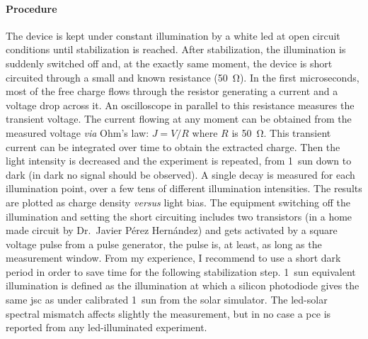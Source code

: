 	\paragraph{Procedure}
	The device is kept under constant illumination by a white \gls{led} at open circuit conditions until stabilization is reached.
	After stabilization, the illumination is suddenly switched off and, at the exactly same moment, the device is short circuited through a small and known resistance (\SI{50}{\ohm}).
	In the first microseconds, most of the free charge flows through the resistor generating a current and a voltage drop across it.
	An oscilloscope in parallel to this resistance measures the transient voltage.
	The current flowing at any moment can be obtained from the measured voltage \textsl{via} Ohm's law: $J=V/R$ where $R$ is \SI{50}{\ohm}.
	This transient current can be integrated over time to obtain the extracted charge.
	Then the light intensity is decreased and the experiment is repeated, from 1~sun down to dark (in dark no signal should be observed).
	A single decay is measured for each illumination point, over a few tens of different illumination intensities.
	The results are plotted as charge density \textsl{versus} light bias.
	The equipment switching off the illumination and setting the short circuiting includes two transistors (in a home made circuit by Dr.\ Javier Pérez Hernández) and gets activated by a square voltage pulse from a pulse generator, the pulse is, at least, as long as the measurement window.
	From my experience, I recommend to use a short dark period in order to save time for the following stabilization step.
	1~sun equivalent illumination is defined as the illumination at which a silicon photodiode gives the same \gls{jsc} as under calibrated 1~sun from the solar simulator.
	The \gls{led}-solar spectral mismatch affects slightly the measurement, but in no case a \gls{pce} is reported from any \gls{led}-illuminated experiment.

